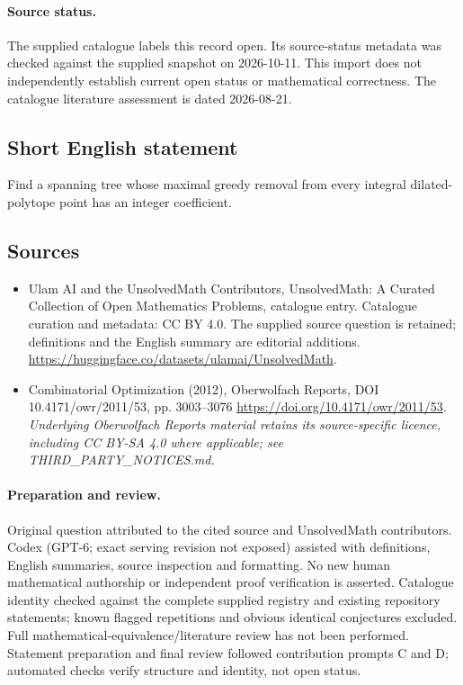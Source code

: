 \documentclass[11pt]{article}
\begin{document}
\paragraph{Source status.}
The supplied catalogue labels this record open. Its source-status metadata was checked against the supplied snapshot on 2026-10-11. This import does not independently establish current open status or mathematical correctness. The catalogue literature assessment is dated 2026-08-21.
\subsection{Short English statement}
Find a spanning tree whose maximal greedy removal from every integral dilated-polytope point has an integer coefficient.
\subsection{Sources}
\begin{itemize}
\item[S1] Ulam AI and the UnsolvedMath Contributors, UnsolvedMath: A Curated Collection of Open Mathematics Problems, catalogue entry. Catalogue curation and metadata: CC BY 4.0. The supplied source question is retained; definitions and the English summary are editorial additions.
\url{https://huggingface.co/datasets/ulamai/UnsolvedMath}.
\item[S2] Combinatorial Optimization (2012), Oberwolfach Reports, DOI 10.4171/owr/2011/53, pp. 3003--3076
\url{https://doi.org/10.4171/owr/2011/53}.
\textit{Underlying Oberwolfach Reports material retains its source-specific licence, including CC BY-SA 4.0 where applicable; see THIRD\_PARTY\_NOTICES.md.}
\end{itemize}
\paragraph{Preparation and review.}
Original question attributed to the cited source and UnsolvedMath contributors. Codex (GPT-6; exact serving revision not exposed) assisted with definitions, English summaries, source inspection and formatting. No new human mathematical authorship or independent proof verification is asserted. Catalogue identity checked against the complete supplied registry and existing repository statements; known flagged repetitions and obvious identical conjectures excluded. Full mathematical-equivalence/literature review has not been performed. Statement preparation and final review followed contribution prompts C and D; automated checks verify structure and identity, not open status.
\label{end:statement}
\end{document}

